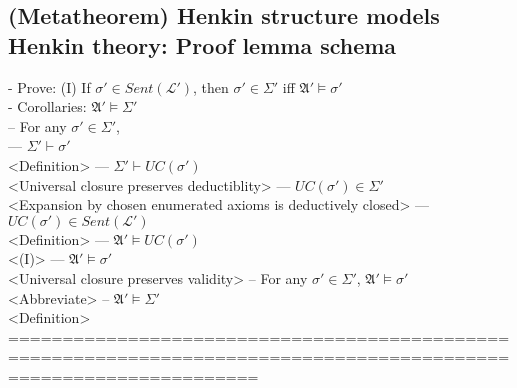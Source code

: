\documentclass{book}
\begin{document}
\subsection{(Metatheorem) Henkin structure models Henkin theory: Proof lemma schema} %
	- Prove: (I) If $\sigma' \in Sent(\mathcal{L}')$, then $\sigma' \in \Sigma'$ iff $\mathfrak{A}' \vDash \sigma'$ \\
	- Corollaries: $\mathfrak{A}' \vDash \Sigma'$ \\
		-- For any $\sigma' \in \Sigma'$, \\
			--- $\Sigma' \vdash \sigma'$ \\ <Definition>
			--- $\Sigma' \vdash UC(\sigma')$ \\ <Universal closure preserves deductiblity>
			--- $UC(\sigma') \in \Sigma'$ \\ <Expansion by chosen enumerated axioms is deductively closed>
			--- $UC(\sigma') \in Sent(\mathcal{L}')$ \\ <Definition>
			--- $\mathfrak{A}' \vDash UC(\sigma')$ \\ <(I)>
			--- $\mathfrak{A}' \vDash \sigma'$ \\ <Universal closure preserves validity>
		-- For any $\sigma' \in \Sigma'$, $\mathfrak{A}' \vDash \sigma'$ \\ <Abbreviate>
		-- $\mathfrak{A}' \vDash \Sigma'$ \\ <Definition>
	===================================================================================================================
\end{document}
